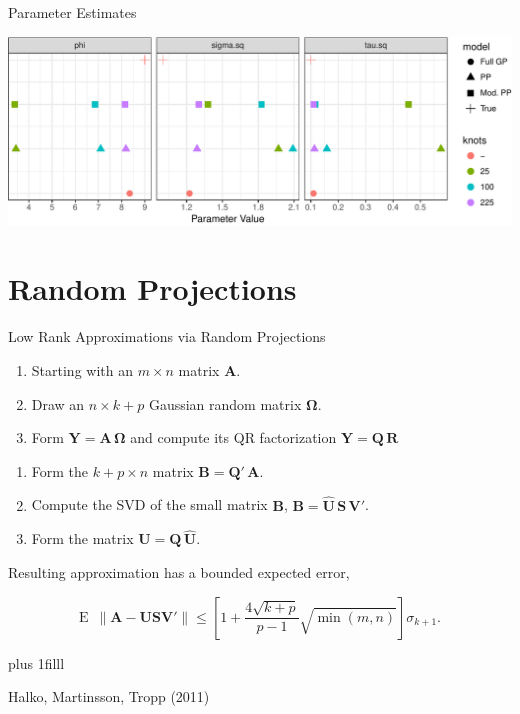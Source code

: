 \documentclass[11pt,ignorenonframetext,]{beamer}
\newcommand{\vvfill}{\vskip0pt plus 1filll}
\begin{document}
\begin{frame}{Parameter Estimates}

\includegraphics{Lec22_files/figure-beamer/unnamed-chunk-15-1.pdf}

\end{frame}

\section{Random Projections}\label{random-projections}

\begin{frame}{Low Rank Approximations via Random Projections}

\begin{enumerate}
\def\labelenumi{\arabic{enumi}.}
\item
  Starting with an \(m \times n\) matrix \(\bm{A}\).
\item
  Draw an \(n \times k+p\) Gaussian random matrix \(\bm{\Omega}\).
\item
  Form \(\bm{Y} = \bm{A}\,\bm{\Omega}\) and compute its QR factorization
  \(\bm{Y} = \bm{Q}\,\bm{R}\)
\end{enumerate}

\begin{enumerate}
\def\labelenumi{\arabic{enumi}.}
\setcounter{enumi}{3}
\item
  Form the \(k+p \times n\) matrix \(\bm{B}=\bm{Q}'\,\bm{A}\).
\item
  Compute the SVD of the small matrix \(\bm{B}\),
  \(\bm{B} = \bm{\hat{U}}\,\bm{S}\,\bm{V}'\).
\item
  Form the matrix \(\bm{U} = \bm{Q} \, \bm{\hat{U}}\).
\end{enumerate}

\vspace{2mm}

Resulting approximation has a bounded expected error,

\[ \text{E } \, \| \bm{A} - \bm{U}\bm{S}\bm{V}'\| \leq \left[1 + \frac{4\sqrt{k+p}}{p-1} \sqrt{\min(m,n)} \right] \sigma_{k+1}. \]

\vvfill

\footnotesize

\begin{center}
Halko, Martinsson, Tropp (2011)
\end{center}

\end{frame}
\end{document}
